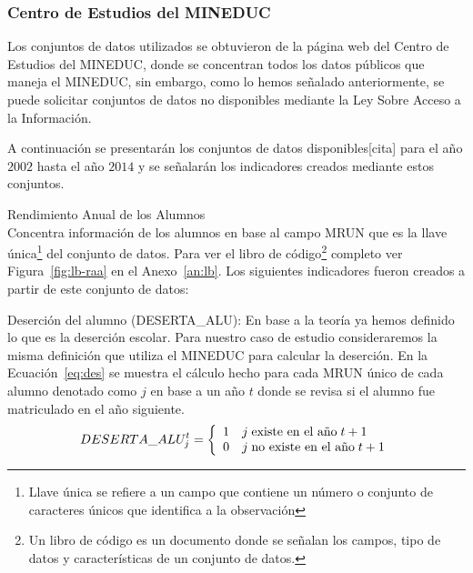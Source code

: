 \subsubsection{Centro de Estudios del MINEDUC}
    Los conjuntos de datos utilizados se obtuvieron de la página web del Centro de Estudios del MINEDUC, donde se concentran todos los datos públicos que maneja el MINEDUC, sin embargo, como lo hemos señalado anteriormente, se puede solicitar conjuntos de datos no disponibles mediante la Ley Sobre Acceso a la Información.
    
    A continuación se presentarán los conjuntos de datos disponibles[cita] para el año $2002$ hasta el año $2014$ y se señalarán los indicadores creados mediante estos conjuntos.
    \begin{longdescription}
        \item[Rendimiento Anual de los Alumnos] \hfill \\
        Concentra información de los alumnos en base al campo MRUN que es la llave única\footnote{Llave única se refiere a un campo que contiene un número o conjunto de caracteres únicos que identifica a la observación} del conjunto de datos. Para ver el libro de código\footnote{Un libro de código es un documento donde se señalan los campos, tipo de datos y características de un conjunto de datos.} completo ver Figura~\ref{fig:lb-raa} en el Anexo~\ref{an:lb}.
        Los siguientes indicadores fueron creados a partir de este conjunto de datos:
            \begin{longdescription}
              \item[Deserción del alumno] (DESERTA\_ALU): En base a la teoría ya hemos definido lo que es la deserción escolar. Para nuestro caso de estudio consideraremos la misma definición que utiliza el MINEDUC para calcular la deserción.
              En la Ecuación~\ref{eq:des} se muestra el cálculo hecho para cada MRUN único de cada alumno denotado como $j$ en base a un año $t$ donde se revisa si el alumno fue matriculado en el año siguiente.
              \begin{equation}
              \centering
              DESERTA\_ALU_{j}^{t} = \left\{
                \begin{array}{c l}
                 1 & j \; \mbox{existe en el año} \; t + 1\\
                 0 & j \; \mbox{no existe en el año} \; t + 1
                \end{array}
                \right.
                \label{eq:des}
              \end{equation}
                

\end{longdescription}
\end{longdescription}
